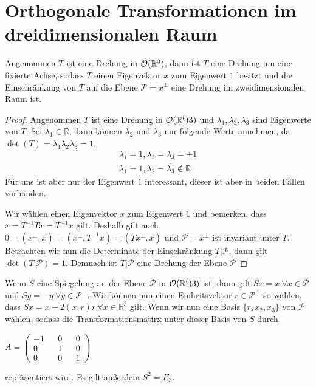 \section{Orthogonale Transformationen im dreidimensionalen Raum}
\begin{theorem}
 Angenommen $T$ ist eine Drehung in ${\mathcal{O}(\mathbb{R}^3)}$, dann ist $T$ eine Drehung um eine fixierte Achse, sodass $T$ einen Eigenvektor $x$ zum Eigenwert $1$ besitzt und die Einschränkung von $T$ auf die Ebene $\mathcal{P}=x^{\perp}$ eine Drehung im zweidimensionalen Raum ist.
\end{theorem}
\begin{proof}
 Angenommen $T$ ist eine Drehung in ${\mathcal{O}(\mathbb{R}^()}3)$ und $\lambda_1,\lambda_2,\lambda_3$ sind Eigenwerte von $T$. Sei $\lambda_1 \in \mathbb{R}$, dann können $\lambda_2$ und $\lambda_3$ nur folgende Werte annehmen, da $\det(T)=\lambda_1\lambda_2\lambda_3=1$.
 \begin{align}
  \lambda_1=1, \lambda_2=\lambda_3=\pm1 \\
  \lambda_1=1, \lambda_2=\overline{\lambda_3}\notin \mathbb{R}
 \end{align}
Für uns ist aber nur der Eigenwert $1$ interessant, dieser ist aber in beiden Fällen vorhanden.

Wir wählen einen Eigenvektor $x$ zum Eigenwert $1$ und bemerken, dass $x=T^{-1}Tx=T^{-1}x$ gilt. Deshalb gilt auch $0=(x^{\perp},x)=(x^{\perp},T^{-1}x)=(Tx^{\perp},x)$ und $\mathcal{P}=x^{\perp}$ ist invariant unter $T$. Betrachten wir nun die Determinate der Einschränkung $T|\mathcal{P}$, dann gilt $\det(T|\mathcal{P})=1$. Demnach ist $T|\mathcal{P}$ eine Drehung der Ebene $\mathcal{P}$
\end{proof}
\begin{bem}
 Wenn $S$ eine Spiegelung an der Ebene $\mathcal{P}$ in ${\mathcal{O}(\mathbb{R}^()}3)$ ist, dann gilt $Sx=x \ \forall x \in \mathcal{P}$ und $Sy=-y \ \forall y \in \mathcal{P}^{\perp}$. Wir können nun einen Einheitsvektor $r \in \mathcal{P}^{\perp}$ so wählen, dass $Sx=x-2(x,r)r \ \forall x\in \mathbb{R}^3$ gilt. Wenn wir nun eine Basis $\{r,x_2,x_3\}$ von $\mathcal{P}$ wählen, sodass die Transformationsmatirx unter dieser Basis von $S$ durch 
 \begin{center}
  $A= \begin{pmatrix}
        -1 && 0 && 0 \\
        0 && 1 && 0 \\
        0 && 0 && 1 
       \end{pmatrix}$
 \end{center}
repräsentiert wird. Es gilt außerdem $S^2 = E_3$.
\end{bem}
